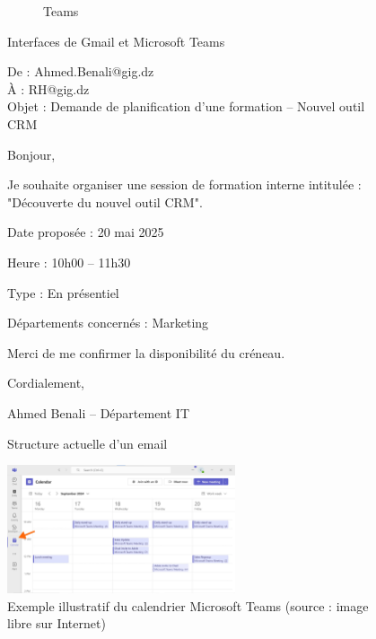 \documentclass{article}
\begin{document}
\begin{figure}[H]
\begin{subfigure}[t]{0.15\textwidth}
    \caption{Teams}
    \label{fig:teams-sub}
  \end{subfigure}
  \caption{Interfaces de Gmail et Microsoft Teams}
  \label{fig:teams1}
\end{figure}


\hspace{1cm}

\begin{figure}[h!]
  \centering
  \begin{tcolorbox}[title=Simulation d’un e-mail de demande de formation]

De : Ahmed.Benali@gig.dz \\
À : RH@gig.dz \\
Objet : Demande de planification d'une formation – Nouvel outil CRM

Bonjour,

Je souhaite organiser une session de formation interne intitulée : "Découverte du nouvel outil CRM".

Date proposée : 20 mai 2025 

Heure : 10h00 – 11h30  

Type : En présentiel  

Départements concernés : Marketing 

Merci de me confirmer la disponibilité du créneau.

\vspace{0,3cm}

Cordialement,  

Ahmed Benali – Département IT
\end{tcolorbox}
  \caption{Structure actuelle d'un email}
  \label{fig:teams2}
\end{figure}

\hspace*{1,5em}
\begin{figure}[h!]
  \centering
  \includegraphics[width=0.6\textwidth]{Teams-calendar.jpg}
  \caption{Exemple illustratif du calendrier Microsoft Teams (source : image libre sur Internet)}
  \label{fig:teamscalendar}
\end{figure}
\end{document}
